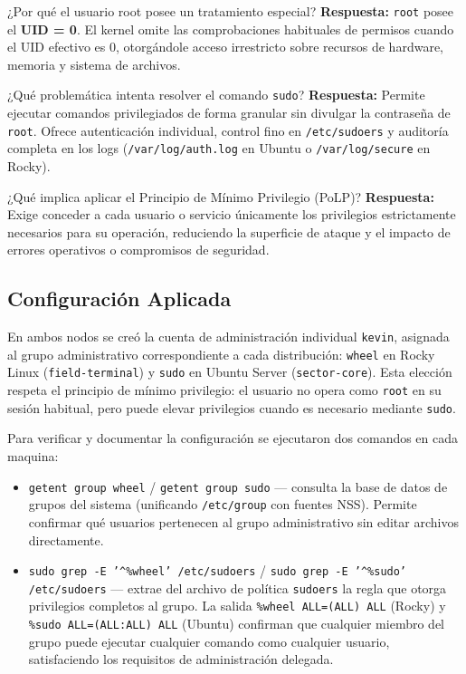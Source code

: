 \documentclass[11pt,a4paper]{article}
\begin{document}
\begin{pregunta}{¿Por qué el usuario root posee un tratamiento especial?}
    \textbf{Respuesta:} \texttt{root} posee el \textbf{UID = 0}. El kernel omite las comprobaciones habituales de permisos cuando el UID efectivo es 0, otorgándole acceso irrestricto sobre recursos de hardware, memoria y sistema de archivos.
\end{pregunta}

\begin{pregunta}{¿Qué problemática intenta resolver el comando \texttt{sudo}?}
    \textbf{Respuesta:} Permite ejecutar comandos privilegiados de forma granular sin divulgar la contraseña de \texttt{root}. Ofrece autenticación individual, control fino en \texttt{/etc/sudoers} y auditoría completa en los logs (\texttt{/var/log/auth.log} en Ubuntu o \texttt{/var/log/secure} en Rocky).
\end{pregunta}

\begin{pregunta}{¿Qué implica aplicar el Principio de Mínimo Privilegio (PoLP)?}
    \textbf{Respuesta:} Exige conceder a cada usuario o servicio únicamente los privilegios estrictamente necesarios para su operación, reduciendo la superficie de ataque y el impacto de errores operativos o compromisos de seguridad.
\end{pregunta}

\subsection{Configuración Aplicada}

En ambos nodos se creó la cuenta de administración individual \texttt{kevin}, asignada al grupo administrativo correspondiente a cada distribución: \texttt{wheel} en Rocky Linux (\texttt{field-terminal}) y \texttt{sudo} en Ubuntu Server (\texttt{sector-core}). Esta elección respeta el principio de mínimo privilegio: el usuario no opera como \texttt{root} en su sesión habitual, pero puede elevar privilegios cuando es necesario mediante \texttt{sudo}.

Para verificar y documentar la configuración se ejecutaron dos comandos en cada maquina:

\begin{itemize}
    \item \texttt{getent group wheel} / \texttt{getent group sudo} — consulta la base de datos de grupos del sistema (unificando \texttt{/etc/group} con fuentes NSS). Permite confirmar qué usuarios pertenecen al grupo administrativo sin editar archivos directamente.
    \item \texttt{sudo grep -E '\^{}\%wheel' /etc/sudoers} / \texttt{sudo grep -E '\^{}\%sudo' /etc/sudoers} — extrae del archivo de política \texttt{sudoers} la regla que otorga privilegios completos al grupo. La salida \texttt{\%wheel ALL=(ALL) ALL} (Rocky) y \texttt{\%sudo ALL=(ALL:ALL) ALL} (Ubuntu) confirman que cualquier miembro del grupo puede ejecutar cualquier comando como cualquier usuario, satisfaciendo los requisitos de administración delegada.
\end{itemize}
\end{document}
